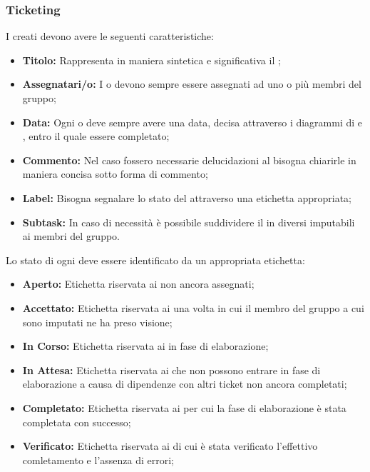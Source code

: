 \documentclass[12pt,a4paper]{article}
\begin{document}
\subsubsection{Ticketing} 
I \textit{} creati devono avere le seguenti caratteristiche:
\begin{itemize}
  \item \textbf{Titolo:} Rappresenta in maniera sintetica e significativa il \textit{};
  \item \textbf{Assegnatari/o:} I \textit{} o \textit{} devono sempre essere assegnati ad uno o più membri del gruppo;
  \item \textbf{Data:} Ogni \textit{} o \textit{} deve sempre avere una data, decisa attraverso i diagrammi di \textit{} e \textit{}, entro il quale essere completato;
  \item \textbf{Commento:} Nel caso fossero necessarie delucidazioni al \textit{} bisogna chiarirle in maniera concisa sotto forma di commento;
  \item \textbf{Label:} Bisogna segnalare lo stato del \textit{} attraverso una etichetta appropriata;
  \item \textbf{Subtask:} In caso di necessità è possibile suddividere il \textit{} in diversi \textit{} imputabili ai membri del gruppo.
\end{itemize}

\newpage
{}
Lo stato di ogni \textit{} deve essere identificato da un appropriata etichetta:
\begin{itemize}
  \item \textbf{Aperto:} Etichetta riservata ai \textit{} non ancora assegnati;
  \item \textbf{Accettato:} Etichetta riservata ai \textit{} una volta in cui il membro del gruppo a cui sono imputati ne ha preso visione;
  \item \textbf{In Corso:} Etichetta riservata ai \textit{} in fase di elaborazione;
  \item \textbf{In Attesa:} Etichetta riservata ai \textit{} che non possono entrare in fase di elaborazione a causa di dipendenze con altri ticket non ancora completati;
  \item \textbf{Completato:} Etichetta riservata ai \textit{} per cui la fase di elaborazione è stata completata con successo;
  \item \textbf{Verificato:} Etichetta riservata ai \textit{} di cui è stata verificato l'effettivo comletamento e l'assenza di errori;
\end{itemize}
\end{document}

